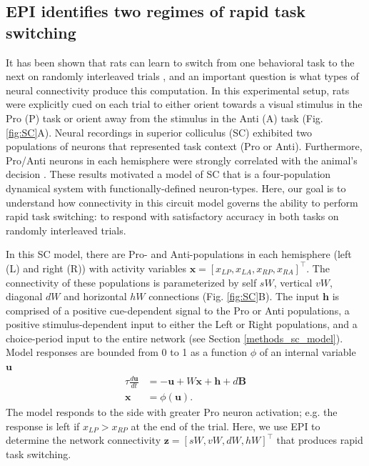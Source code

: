 \documentclass[11pt]{article}
\begin{document}
\subsection{EPI identifies two regimes of rapid task switching} \label{results_SC}
It has been shown that rats can learn to switch from one behavioral task to the next on randomly interleaved trials \cite{duan2015requirement}, and an important question is what types of neural connectivity produce this computation.
In this experimental setup, rats were explicitly cued on each trial to either orient towards a visual stimulus in the Pro (P) task or orient away from the stimulus in the Anti (A) task (Fig. \ref{fig:SC}A). 
Neural recordings in superior colliculus (SC) exhibited two populations of neurons that represented task context (Pro or Anti).
Furthermore, Pro/Anti neurons in each hemisphere were strongly correlated with the animal's decision \cite{duan2018collicular}.
These results motivated a model of SC that is a four-population dynamical system with functionally-defined neuron-types.
Here, our goal is to understand how connectivity in this circuit model governs the ability to perform rapid task switching: to respond with satisfactory accuracy in both tasks on randomly interleaved trials.

In this SC model, there are Pro- and Anti-populations in each hemisphere (left (L) and right (R)) with activity variables $\mathbf{x} = [x_{LP}, x_{LA}, x_{RP}, x_{RA}]^\top$.
The connectivity of these populations is parameterized by self $sW$, vertical $vW$, diagonal $dW$ and horizontal $hW$ connections (Fig. \ref{fig:SC}B).
The input $\mathbf{h}$ is comprised of a positive cue-dependent signal to the Pro or Anti populations, a positive stimulus-dependent input to either the Left or Right populations, and a choice-period input to the entire network (see Section \ref{methods_sc_model}).
Model responses are bounded from 0 to 1 as a function $\phi$ of an internal variable $\mathbf{u}$
\begin{equation}
\begin{split}
\tau \frac{d\mathbf{u}}{dt} &= -\mathbf{u} + W\mathbf{x} + \mathbf{h} + d\mathbf{B} \\
\mathbf{x} &= \phi(\mathbf{u}).
\end{split}
\end{equation}
The model responds to the side with greater Pro neuron activation; e.g. the response is left if $x_{LP} > x_{RP}$ at the end of the trial.  
Here, we use EPI to determine the network connectivity $\mathbf{z} = [sW, vW, dW, hW]^{\top}$ that produces rapid task switching.
\end{document}
